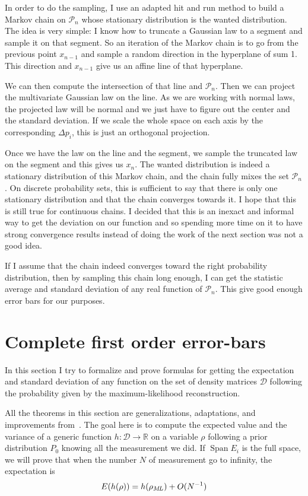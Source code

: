 \documentclass[10pt,a4paper]{report}
\theoremstyle{plain}
\theoremstyle{definition}
\theoremstyle{remark}
\newcommand{\R}{\ensuremath{\mathbb{R}}}
\DeclareMathOperator{\Span}{Span}
\newcommand{\ml}{_{M\!L}}
\begin{document}
In order to do the sampling, I use an adapted hit and run method to build a
Markov chain on $\mathcal{P}_n$ whose stationary
distribution is the wanted distribution. The idea is very simple: I know how to
truncate a Gaussian law to a segment and sample it on that segment. So an
iteration of the Markov chain is to go from the previous point $x_{n-1}$ and
sample a random direction in the hyperplane of sum 1. This direction and
$x_{n-1}$ give us an affine line of that hyperplane.

We can then compute the
intersection of that line and $\mathcal{P}_n$. Then we can project the
multivariate Gaussian law on the line. As we are working with normal laws, the
projected law will be normal and we just have to figure out the center and the
standard deviation. If we scale the whole space on each axis by the
corresponding $\Delta p_i$, this is just an orthogonal projection.

Once we have the law on the line and the segment, we sample the truncated law on
the segment and this gives us $x_n$. The wanted distribution is indeed a
stationary distribution of this Markov chain, and the chain fully mixes the set
$\mathcal{P}_n$. On discrete probability sets, this is sufficient to say that there
is only one stationary distribution and that the chain converges towards it. I
hope that this is still true for continuous chains. I decided that this is an inexact
and informal way to get the deviation on our function and so spending more time
on it to have strong convergence results
instead of doing the work of the next section was not a good idea.

If I assume that the chain indeed converges toward the right probability
distribution, then by sampling this chain long enough, I
can get the statistic average and standard deviation of any real function of
$\mathcal{P}_n$. This give good enough error bars for our purposes.

\section{Complete first order error-bars}\label{sec:errbar}

In this section I try to formalize and prove formulas for getting the
expectation and standard deviation of any function on the set of density
matrices $\mathcal{D}$ following the probability given by the maximum-likelihood
reconstruction.

All the theorems in this section are generalizations,
adaptations, and improvements from~\cite{SPRAL17}. The goal here is to compute
the expected value and the variance of a generic function $h : \mathcal{D} \to
\R$ on a variable $\rho$ following a prior distribution $P_0$
knowing all the measurement
we did. If $\Span E_i$ is the full space,
we will prove that when the number $N$ of measurement go to infinity, the
expectation is
\[E(h(\rho)) = h(\rho\ml) + O(N\inv)\]
\end{document}
